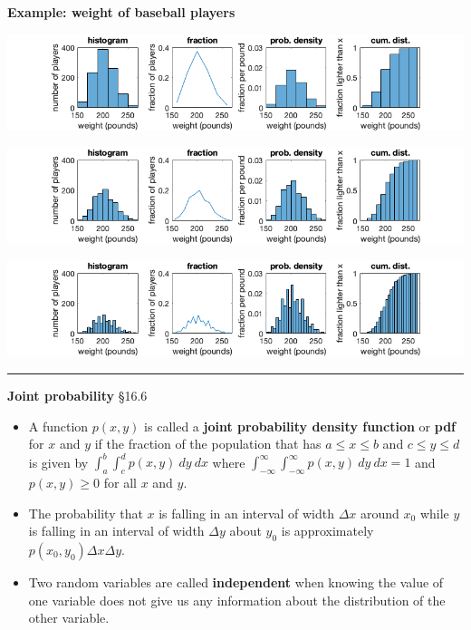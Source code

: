 \documentclass[12pt,letterpaper,noanswers]{exam}
\begin{document}
\eject

\noindent\textbf{Example: weight of baseball players}

\includegraphics[width=\textwidth]{img/C14histboxweight20.png}

\includegraphics[width=\textwidth]{img/C14histboxweight10.png}

\includegraphics[width=\textwidth]{img/C14histboxweight05.png}

\vspace{0.2cm}
\hrule
\vspace{0.2cm}

\noindent\textbf{Joint probability} \S 16.6
\begin{tcolorbox}
\begin{itemize}
\itemsep0em
    \item A function $p(x,y)$ is called a \textbf{joint probability density function} or \textbf{pdf} for $x$ and $y$ if the fraction of the population that has $a\leq x\leq b$ and $c\leq y\leq d$ is given by $\int_a^b\int_c^d p(x,y)\ dy\ dx$ where $\int_{-\infty}^{\infty}\int_{-\infty}^{\infty} p(x,y)\ dy\ dx = 1$ and $p(x,y)\geq 0$ for all $x$ and $y$. 
    \item The probability that $x$ is falling in an interval of width $\Delta x$ around $x_0$ while $y$ is falling in an interval of width $\Delta y$ about $y_0$ is approximately $p(x_0,y_0)\Delta x \Delta y.$
  \item Two random variables are called \textbf{independent} when knowing the value of one variable does not give us any information about the distribution of the other variable.
\end{itemize}
\end{tcolorbox}
\end{document}

